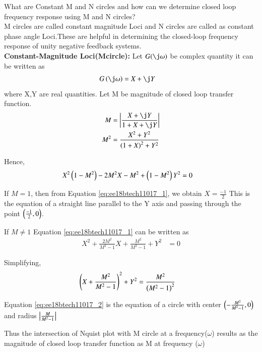 
\item
What are Constant M and N circles and how can we determine closed loop frequency response using M and N circles? \\
\solution 
M circles are called constant magnitude Loci and N circles are called as
constant phase angle Loci.These are helpful in determining the closed-loop frequency response of unity negative feedback systems. \\

\textbf{Constant-Magnitude Loci(Mcircle):} Let $G(\j\omega)$ be complex quantity it can be written as 
\begin{align}
G\brak{\j \omega} &= X+\j Y
\end{align}
where X,Y are real quantities.
Let M be magnitude of closed loop transfer function.
\begin{align}
M &= \abs{\frac{X+\j Y}{1+X+\j Y}}
\\
M^{2} &= \frac{X^{2}+Y^{2}}{\brak{1+X}^{2}+Y^{2}}
\label{eq:ee18btech11017_3}
\end{align}

Hence,
\begin{align}
X^{2}\left(1-M^{2}\right)-2M^{2}X-M^{2}+\left(1-M^{2}\right)Y^{2} &= 0
\label{eq:ee18btech11017_1}
\end{align}

If $M=1$, then from Equation \eqref{eq:ee18btech11017_1}, we obtain $X =\frac{-1}{2}$ This is the equation of a straight line parallel to the Y axis and passing through the point $\left(\frac{-1}{2},0\right)$.

If $M \neq 1$ Equation \eqref{eq:ee18btech11017_1} can be written as
\begin{align}
X^{2}+\frac{2M^{2}}{M^{2}-1}X+\frac{M^{2}}{M^{2}-1}+Y^{2} &= 0
\end{align}

Simplifying,
\begin{align}
\left(X+\frac{M^{2}}{M^{2}-1}\right)^{2}+Y^{2} &= \frac{M^{2}}{\left(M^{2}-1\right)^{2}}
\label{eq:ee18btech11017_2}
\end{align}

Equation \eqref{eq:ee18btech11017_2} is the equation of a circle with center 
$\left(-\frac{M^{2}}{M^{2}-1},0\right)$ and radius $\left\vert\frac{M}{M^{2}-1}\right\vert$

Thus the intersection of Nquist plot with M circle at a frequency($\omega$) results as the magnitude of closed loop transfer function as M at frequency ($\omega$)

